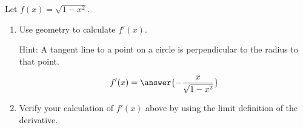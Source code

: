 \documentclass{ximera}
\author{Steven Gubkin}
\begin{document}
\begin{exercise}



Let $f(x) = \sqrt{1-x^2}$.  
\begin{enumerate}
\item Use geometry to calculate $f'(x)$.

Hint:  A tangent line to a point on a circle is perpendicular to the radius to that point.

\begin{prompt}
	\[f'(x) = \answer{ -\frac{x}{\sqrt{1-x^2}}} \]
\end{prompt}

\item Verify your calculation of $f'(x)$ above by using the limit definition of the derivative.

\end{enumerate}


\end{exercise}
\end{document}
